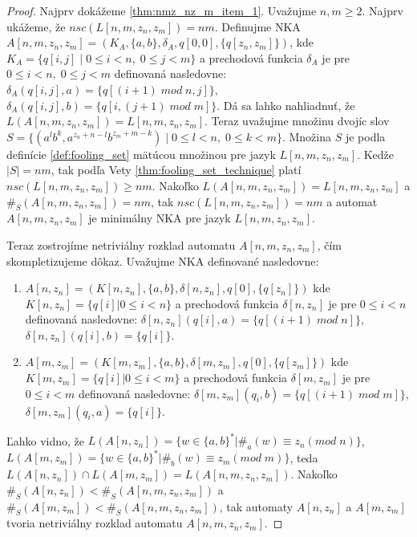 \begin{proof}
Najprv dokážeme \ref{thm:nmz_nz_m_item_1}. Uvažujme $ n,m \geq 2 $. Najprv ukážeme, že $ nsc(L[n,m,z_n,z_m])=nm $. Definujme NKA $ A[n,m,z_n,z_m]=(K_A,\lbrace a,b \rbrace,\delta_A,q[0,0],\lbrace q[z_n,z_m] \rbrace) $, kde $ K_A = \lbrace q[i,j] \; | \; 0 \leq i < n, \; 0 \leq j < m \rbrace $ a prechodová funkcia $ \delta_A $ je pre $ 0 \leq i < n, \; 0 \leq j < m $ definovaná nasledovne: $ \delta_A(q[i,j],a) = \lbrace q[(i+1) \; mod \; n,j] \rbrace $, $ \delta_A(q[i,j],b) = \lbrace q[i, (j+1) \; mod \; m] \rbrace $. Dá sa lahko nahliadnuť, že $ L(A[n,m,z_n,z_m])=L[n,m,z_n,z_m] $. Teraz uvažujme množinu dvojíc slov $ S = \lbrace (a^lb^k, a^{z_n+n-l}b^{z_m+m-k}) \; | \; 0 \leq l < n, \; 0 \leq k < m \rbrace $. Množina $ S $ je podla definície \ref{def:fooling_set} mätúcou množinou pre jazyk $ L[n,m,z_n,z_m] $. Kedže $ |S|=nm $, tak podľa Vety \ref{thm:fooling_set_technique} platí $ nsc(L[n,m,z_n,z_m]) \geq nm $. Nakoľko $ L(A[n,m,z_n,z_m])=L[n,m,z_n,z_m] $ a $ \#_S(A[n,m,z_n,z_m])=nm $, tak $ nsc(L[n,m,z_n,z_m])=nm $ a automat $ A[n,m,z_n,z_m] $ je minimálny NKA pre jazyk $ L[n,m,z_n,z_m] $.
\par
Teraz zostrojíme netriviálny rozklad automatu $ A[n,m,z_n,z_m] $, čím skompletizujeme dôkaz. Uvažujme NKA definované nasledovne:
\begin{enumerate}  
\item $ A[n,z_n] = (K[n,z_n],\lbrace a,b \rbrace,\delta[n,z_n],q[0],\lbrace q[z_n] \rbrace)$ kde $ K[n,z_n] = \lbrace q[i] | 0 \leq i < n\rbrace $ a prechodová funkcia $ \delta[n,z_n] $ je pre $ 0 \leq i < n $ definovaná nasledovne: $ \delta[n,z_n](q[i],a) = \lbrace q[(i+1) \; mod \; n] \rbrace $, $ \delta[n,z_n](q[i],b) = \lbrace q[i] \rbrace $.
\item $ A[m,z_m] = (K[m,z_m],\lbrace a,b \rbrace,\delta[m,z_m],q[0],\lbrace q[z_m] \rbrace)$ kde $ K[m,z_m] = \lbrace q[i] | 0 \leq i < m \rbrace $ a prechodová funkcia $ \delta[m,z_m] $ je pre $ 0 \leq i < m $ definovaná nasledovne: $ \delta[m,z_m](q_i,b) = \lbrace q[(i+1) \; mod \; m] \rbrace $, $ \delta[m,z_m](q_i,a) = \lbrace q[i] \rbrace $.
\end{enumerate}
Ľahko vidno, že $ L(A[n,z_n]) = \lbrace w \in \lbrace a,b \rbrace^{*} | \#_a(w) \equiv z_n (mod \; n) \rbrace$, $ L(A[m,z_m]) = \lbrace w \in \lbrace a,b \rbrace^{*} | \#_b(w) \equiv z_m (mod \; m) \rbrace $, teda $ L(A[n,z_n]) \cap L(A[m,z_m]) = L(A[n,m,z_n,z_m]) $. Nakoľko $ \#_S(A[n,z_n]) < \#_S(A[n,m,z_n,z_m]) $ a $ \#_S(A[m,z_m]) < \#_S(A[n,m,z_n,z_m]) $, tak automaty $ A[n,z_n] $ a $ A[m,z_m] $ tvoria netriviálny rozklad automatu $ A[n,m,z_n,z_m] $.

\end{proof}
